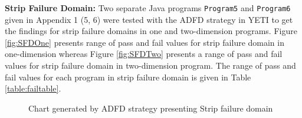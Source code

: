 



\newpage
\noindent \textbf{Strip Failure Domain:} Two separate Java programs \verb+Program5+ and \verb+Program6+ given in Appendix 1 (5, 6) were tested with the ADFD strategy in YETI to get the findings for strip failure domains in one and two-dimension programs. Figure \ref{fig:SFDOne} presents range of pass and fail values for strip failure domain in one-dimension whereas Figure \ref{fig:SFDTwo} presents a range of pass and fail values for strip failure domain in two-dimension program. The range of pass and fail values for each program in strip failure domain is given in Table \ref{table:failtable}.


%
\begin{figure} [H]
\centering
{}
\bigskip
{}
\bigskip
\caption{Chart generated by ADFD strategy presenting Strip failure domain}
\end{figure}






